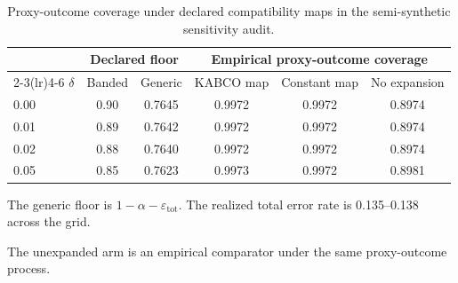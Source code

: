\begin{table}[pos=htbp]
\caption{Proxy-outcome coverage under declared compatibility maps in the semi-synthetic sensitivity audit.}\label{tbl:noise}
\centering\footnotesize
\begin{threeparttable}
\begin{tabular*}{\tblwidth}{@{\extracolsep{\fill}}lccccc@{}}
\toprule
 & \multicolumn{2}{c}{Declared floor} & \multicolumn{3}{c}{Empirical proxy-outcome coverage} \\
\cmidrule(lr){2-3}\cmidrule(lr){4-6}
$\delta$ & Banded & Generic\tnote{a} & KABCO map & Constant map & No expansion\tnote{b} \\
\midrule
0.00 & 0.90 & 0.7645 & 0.9972 & 0.9972 & 0.8974 \\
0.01 & 0.89 & 0.7642 & 0.9972 & 0.9972 & 0.8974 \\
0.02 & 0.88 & 0.7640 & 0.9972 & 0.9972 & 0.8974 \\
0.05 & 0.85 & 0.7623 & 0.9973 & 0.9972 & 0.8981 \\
\bottomrule
\end{tabular*}
\begin{tablenotes}\footnotesize
\item[a] The generic floor is $1-\alpha-\varepsilon_{\mathrm{tot}}$. The realized total error rate is 0.135--0.138 across the grid.
\item[b] The unexpanded arm is an empirical comparator under the same proxy-outcome process.
\end{tablenotes}
\end{threeparttable}
\end{table}
